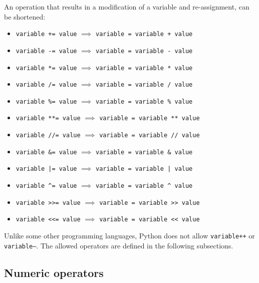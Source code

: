 \documentclass[11pt,a4paper]{article}
\begin{document}
An operation that results in a modification of a variable and re-assignment, can be shortened:
%
\begin{itemize}\parskip=0pt
\item \texttt{variable~+=~value} $\implies$ \texttt{variable = variable + value}
\item \texttt{variable~-=~value} $\implies$ \texttt{variable = variable - value}
\item \texttt{variable~*=~value} $\implies$ \texttt{variable = variable * value}
\item \texttt{variable~/=~value} $\implies$ \texttt{variable = variable / value}
\item \texttt{variable~\%=~value} $\implies$ \texttt{variable = variable \% value}
\item \texttt{variable~**=~value} $\implies$ \texttt{variable = variable ** value}
\item \texttt{variable~//=~value} $\implies$ \texttt{variable = variable // value}
\item \texttt{variable~\&=~value} $\implies$ \texttt{variable = variable \& value}
\item \texttt{variable~|=~value} $\implies$ \texttt{variable = variable | value}
\item \texttt{variable~\^{}=~value} $\implies$ \texttt{variable = variable \^{} value}
\item \texttt{variable~>>=~value} $\implies$ \texttt{variable = variable >> value}
\item \texttt{variable~<<=~value} $\implies$ \texttt{variable = variable << value}
\end{itemize}
%
Unlike some other programming languages, Python does not allow \texttt{variable++} or\\ \texttt{variable--}.  The allowed operators are defined in the following subsections.

\subsection{Numeric operators \label{section:numeric-operators}}
\end{document}
